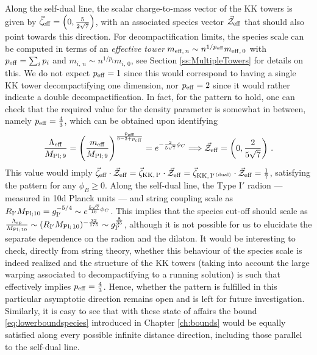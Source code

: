 Along the self-dual line, the scalar charge-to-mass vector of the KK towers is given by $\vec{\zeta}_{\rm eff}=\left(0,\frac{5}{2\sqrt{7}}\right)$, with an associated species vector $\vec{\mathcal{Z}}_{\rm eff}$ that should also point towards this direction. For decompactification limits, the species scale can be computed in terms of an \emph{effective tower} $m_{\text{eff},\, n}\sim n^{1/p_{\rm eff}}m_{\rm eff,\, 0}$ with  $p_{\rm eff}=\sum_i p_i$ and $m_{i,\, n}\sim n^{1/p_{i}}m_{i,\, 0}$, see Section \ref{ss:MultipleTowers} for details on this. We do not expect $p_{\rm eff}=1$ since this would correspond to having a single KK tower decompactifying one dimension, nor $p_{\rm eff}=2$ since it would rather indicate a double decompactification. In fact, for the pattern to hold, one can check that the required value for the density parameter is somewhat in between, namely $p_{\rm eff}=\frac{4}{3}$, which can be obtained upon identifying
%
\begin{equation}
	\frac{\Lambda_{\rm eff}}{M_{\text{Pl;}\, 9}}=\left(\frac{m_{\rm eff}}{M_{\text{Pl;}\, 9}}\right)^{\frac{p_{\rm eff}}{9-2+p_{\rm eff}}}=e^{-\frac{2}{5\sqrt{7}}\phi_C}\Longrightarrow \vec{\mathcal{Z}}_{\rm eff}=\left(0,\frac{2}{5\sqrt{7}} \right)\, .
\end{equation}
%
This value would imply $\vec{\zeta}_{\rm eff}\cdot\vec{\mathcal{Z}}_{\rm eff}=\vec{\zeta}_{\rm KK,\, I'}\cdot\vec{\mathcal{Z}}_{\rm eff}=\vec{\zeta}_{\rm KK,\, I'^{\,(dual)}}\cdot\vec{\mathcal{Z}}_{\rm eff}=\frac{1}{7}$, satisfying the pattern for any $\phi_B\geq 0$. Along the self-dual line, the Type I$'$ radion --- measured in 10d Planck units --- and string coupling scale as $R_{\rm I'}M_{\rm Pl; 10}=g_{\rm I'}^{-5/4}\sim e^{\frac{5\sqrt{7}}{16}\phi_C}$. This implies that the species cut-off should scale as $\frac{\Lambda_{\text{sp}}}{M_{\rm Pl;\, 10}}\sim (R_{\rm I'}M_{\rm Pl;\, 10})^{-\frac{32}{175}}\sim g_{\rm I'}^{\frac{8}{35}}$, although it is not possible for us to elucidate the separate dependence on the radion and the dilaton. It would be interesting to check, directly from string theory, whether this behaviour of the species scale is indeed realized and the structure of the KK towers (taking into account the large warping associated to decompactifying to a running solution) is such that effectively implies  $p_{\rm eff}=\frac{4}{3}$. Hence, whether the pattern is fulfilled in this particular asymptotic direction remains open and is left for future investigation. Similarly, it is easy to see that with these state of affairs the bound \eqref{eq:lowerboundspecies} introduced in Chapter \ref{ch:bounds} would be equally satisfied along every possible infinite distance direction, including those parallel to the self-dual line. 
	
